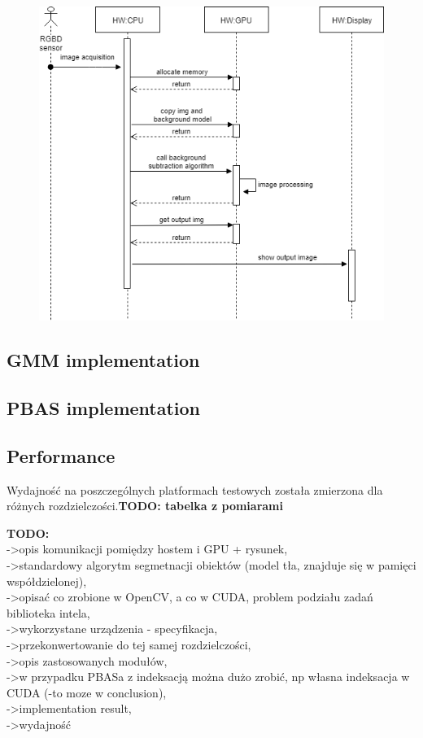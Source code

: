 \documentclass[b5paper,10pt,twoside]{article}
\begin{document}
{\begin{figure}[!t]
	\begin{center}
		\includegraphics[scale=0.50]{img/gpu_bs_alg.png}
		\caption{}
		\label{fig:gpu_alg}
	\end{center}
\end{figure}

\subsection{GMM implementation}
\label{subsec:gmm_implementation}


\subsection{PBAS implementation}
\label{subsec:pbas_implementation}


\subsection{Performance}
\label{subsec:performance}

Wydajność na poszczególnych platformach testowych została zmierzona dla różnych rozdzielczości.\textbf{TODO: tabelka z pomiarami}

\textbf{TODO:}\\ 
->opis komunikacji pomiędzy hostem i GPU + rysunek,\\ 
->standardowy algorytm segmetnacji obiektów (model tła, znajduje się w pamięci współdzielonej), \\
->opisać co zrobione w OpenCV, a co w CUDA, problem podziału zadań 
biblioteka intela,\\
->wykorzystane urządzenia - specyfikacja,\\
->przekonwertowanie do tej samej rozdzielczości,\\
->opis zastosowanych modułów,\\
->w przypadku PBASa z indeksacją można dużo zrobić, np własna indeksacja w CUDA (-to moze w conclusion),\\
->implementation result,\\
->wydajność


}
\end{document}
